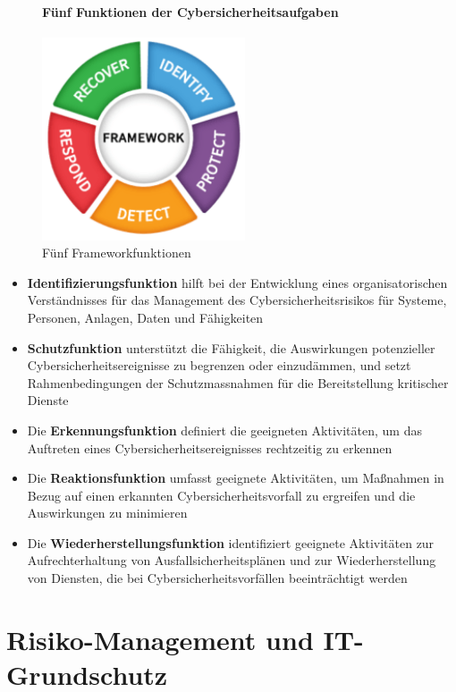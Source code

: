 \documentclass[10pt,a4paper]{article}
\begin{document}
\begin{figure}[H]
\paragraph*{Fünf Funktionen der Cybersicherheitsaufgaben}
    \begin{center}
    \includegraphics[width=6cm]{images/NISTfunctions.png}
    \caption{Fünf Frameworkfunktionen}
    \label{nistfunctions}
    \end{center}
\end{figure}
\begin{itemize}[noitemsep,topsep=0pt,leftmargin=*]
    \item \textbf{Identifizierungsfunktion} hilft bei der Entwicklung eines organisatorischen Verständnisses für das Management des Cybersicherheitsrisikos für Systeme, Personen, Anlagen, Daten und Fähigkeiten
    \item \textbf{Schutzfunktion} unterstützt die Fähigkeit, die Auswirkungen potenzieller Cybersicherheitsereignisse zu begrenzen oder einzudämmen, und setzt Rahmenbedingungen der Schutzmassnahmen für die Bereitstellung kritischer Dienste
    \item Die \textbf{Erkennungsfunktion} definiert die geeigneten Aktivitäten, um das Auftreten eines Cybersicherheitsereignisses rechtzeitig zu erkennen
    \item Die \textbf{Reaktionsfunktion} umfasst geeignete Aktivitäten, um Maßnahmen in Bezug auf einen erkannten Cybersicherheitsvorfall zu ergreifen und die Auswirkungen zu minimieren
    \item Die \textbf{Wiederherstellungsfunktion} identifiziert geeignete Aktivitäten zur Aufrechterhaltung von Ausfallsicherheitsplänen und zur Wiederherstellung von Diensten, die bei Cybersicherheitsvorfällen beeinträchtigt werden
\end{itemize}


\section{Risiko-Management und IT-Grundschutz}
\end{document}
